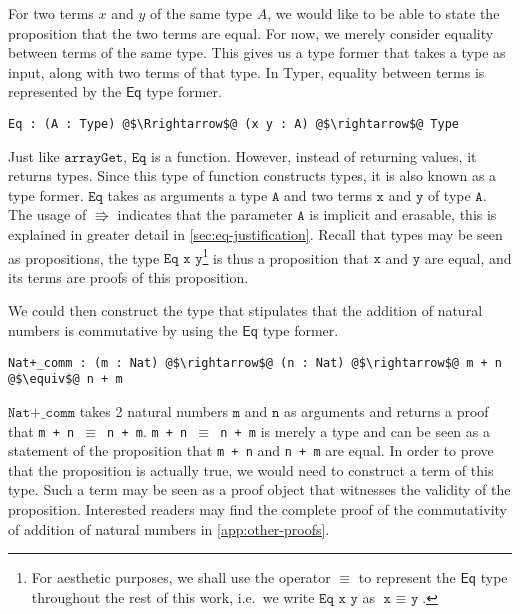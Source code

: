 \documentclass[12pt,twoside,maitrise]{dms}
\theoremstyle{definition}
\numberwithin{equation}{section}
\numberwithin{table}{chapter}
\numberwithin{figure}{chapter}
\newcommand\kw[1] {\textsf{#1}}
\newcommand\id[1] {\texttt{#1}}
\newcommand\fn[1] {\texttt{#1}}
\begin{document}

For two terms $x$ and $y$ of the same type $A$, we would like to be able to
state the proposition that the two terms are equal. For now, we merely consider
equality between terms of the same type. This gives us a type former that takes
a type as input, along with two terms of that type. In Typer, equality between
terms is represented by the $\kw{Eq}$ type former.

\begin{verbatim}
Eq : (A : Type) @$\Rrightarrow$@ (x y : A) @$\rightarrow$@ Type
\end{verbatim}

Just like $\id{arrayGet}$, $\id{Eq}$ is a function. However, instead of
returning values, it returns types. Since this type of function constructs
types, it is also known as a type former. $\id{Eq}$ takes as arguments a type
$\id{A}$ and two terms $\id{x}$ and $\id{y}$ of type $\id{A}$. The usage of
$\Rrightarrow$ indicates that the parameter $\id{A}$ is implicit and erasable,
this is explained in greater detail in \autoref{sec:eq-justification}. Recall
that types may be seen as propositions, the type $\fn{Eq x y}$\footnote{For
aesthetic purposes, we shall use the operator $\equiv$ to represent the
$\kw{Eq}$ type throughout the rest of this work, i.e.\ we write $\fn{Eq x y}$ as
$\fn{x $\equiv$ y}$.} is thus a proposition that $\fn{x}$ and $\fn{y}$ are
equal, and its terms are proofs of this proposition.

We could then construct the type that stipulates that the addition of natural
numbers is commutative by using the $\kw{Eq}$ type former.

\begin{verbatim}
Nat+_comm : (m : Nat) @$\rightarrow$@ (n : Nat) @$\rightarrow$@ m + n @$\equiv$@ n + m
\end{verbatim}

$\fn{Nat+\_comm}$ takes 2 natural numbers $\fn{m}$ and $\fn{n}$ as arguments and
returns a proof that \fn{m + n $\equiv$ n + m}. \fn{m + n $\equiv$ n + m} is
merely a type and can be seen as a statement of the proposition that \fn{m + n}
and \fn{n + m} are equal. In order to prove that the proposition is actually
true, we would need to construct a term of this type. Such a term may be seen as
a proof object that witnesses the validity of the proposition. Interested
readers may find the complete proof of the commutativity of addition of natural
numbers in \autoref{app:other-proofs}.
\end{document}

